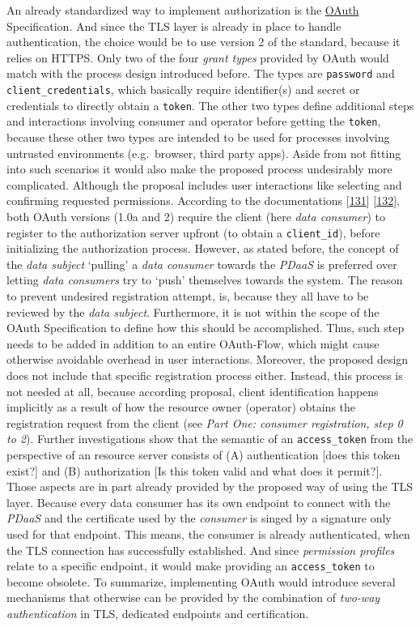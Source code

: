 \documentclass[12pt,english,a4paper,titlepage,cleardoublepage=empty,dottedtoc]{report}
\begin{document}
An already standardized way to implement authorization is the
\protect\hyperlink{def--oauth}{OAuth} Specification. And since the TLS
layer is already in place to handle authentication, the choice would be
to use version 2 of the standard, because it relies on HTTPS. Only two
of the four \emph{grant types} provided by OAuth would match with the
process design introduced before. The types are \texttt{password} and
\texttt{client\_credentials}, which basically require identifier(s) and
secret or credentials to directly obtain a \texttt{token}. The other two
types define additional steps and interactions involving consumer and
operator before getting the \texttt{token}, because these other two
types are intended to be used for processes involving untrusted
environments (e.g.~browser, third party apps). Aside from not fitting
into such scenarios it would also make the proposed process undesirably
more complicated. Although the proposal includes user interactions like
selecting and confirming requested permissions. According to the
documentations
{[}\protect\hyperlink{ref-web_spec_oauth-1a_client-reg}{131}{]}
{[}\protect\hyperlink{ref-web_spec_oauth-2_client-reg}{132}{]}, both
OAuth versions (1.0a and 2) require the client (here \emph{data
consumer}) to register to the authorization server upfront (to obtain a
\texttt{client\_id}), before initializing the authorization process.
However, as stated before, the concept of the \emph{data subject}
`pulling' a \emph{data consumer} towards the \emph{PDaaS} is preferred
over letting \emph{data consumers} try to `push' themselves towards the
system. The reason to prevent undesired registration attempt, is,
because they all have to be reviewed by the \emph{data subject}.
Furthermore, it is not within the scope of the OAuth Specification to
define how this should be accomplished. Thus, such step needs to be
added in addition to an entire OAuth-Flow, which might cause otherwise
avoidable overhead in user interactions. Moreover, the proposed design
does not include that specific registration process either. Instead,
this process is not needed at all, because according proposal, client
identification happens implicitly as a result of how the resource owner
(operator) obtains the registration request from the client (see
\emph{Part One: consumer registration, step 0 to 2}). Further
investigations show that the semantic of an \texttt{access\_token} from
the perspective of an resource server consists of (A) authentication
{[}does this token exist?{]} and (B) authorization {[}Is this token
valid and what does it permit?{]}. Those aspects are in part already
provided by the proposed way of using the TLS layer. Because every data
consumer has its own endpoint to connect with the \emph{PDaaS} and the
certificate used by the \emph{consumer} is singed by a signature only
used for that endpoint. This means, the consumer is already
authenticated, when the TLS connection has successfully established. And
since \emph{permission profiles} relate to a specific endpoint, it would
make providing an \texttt{access\_token} to become obsolete. To
summarize, implementing OAuth would introduce several mechanisms that
otherwise can be provided by the combination of \emph{two-way
authentication} in TLS, dedicated endpoints and certification.
\end{document}
